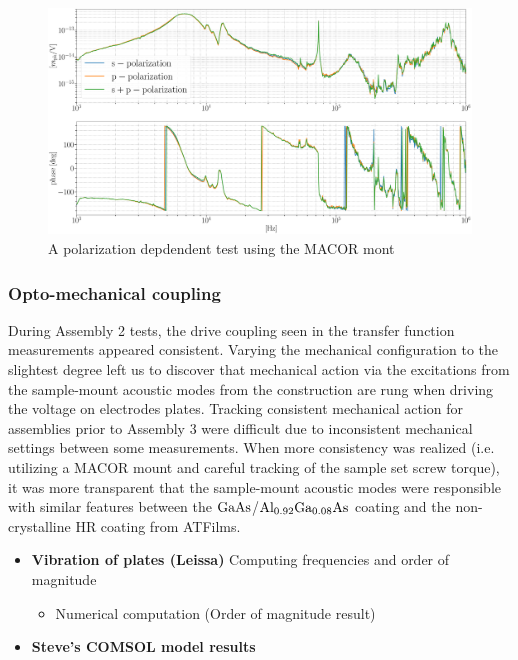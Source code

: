 \begin{figure}[H]
    \includegraphics[width=\textwidth]{figs/ALGAAS/results_figs/assembly3/petgmsvv64.pdf}
    \caption{A polarization depdendent test using the MACOR mont}
    \label{fig:measurementsum}
\end{figure}

\subsubsection{Opto-mechanical coupling}
During Assembly 2 tests, the drive coupling seen in the transfer function measurements appeared consistent. Varying the mechanical configuration to the slightest degree left us to discover that mechanical action via the excitations from the sample-mount acoustic modes from the construction are rung when driving the voltage on electrodes plates. Tracking consistent mechanical action for assemblies prior to Assembly 3 were difficult due to inconsistent mechanical settings between some measurements. When more consistency was realized (i.e. utilizing a MACOR mount and careful tracking of the sample set screw torque), it was more transparent that the sample-mount acoustic modes were responsible with similar features between the $\mathrm{GaAs}$/$\mathrm{Al_{0.92}Ga_{0.08}As}$ coating and the non-crystalline HR coating from ATFilms.

\begin{itemize}
\item \textbf{Vibration of plates (Leissa)} \cite{leissa:1969} Computing frequencies and order of magnitude
	\begin{itemize}
	    \item Numerical computation (Order of magnitude result)
	\end{itemize}
\item \textbf{Steve's COMSOL model results}
\end{itemize}

